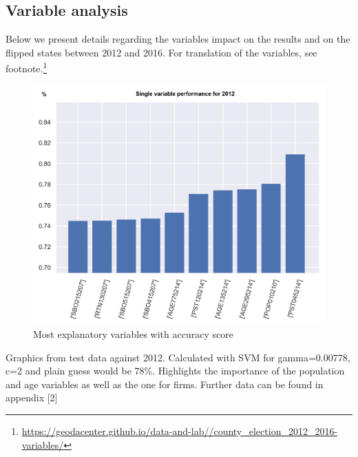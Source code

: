 \subsection{Variable analysis}
Below we present details regarding the variables impact on the results and on the flipped states between 2012 and 2016. For translation of the variables, see footnote.\footnote{\url{https://geodacenter.github.io/data-and-lab//county_election_2012_2016-variables/}}
\begin{figure}[H]
\centering
\includegraphics[scale=0.2]{pictures/results/max_12.png} 
\caption{Most explanatory variables with accuracy score}
\end{figure}
Graphics from test data against 2012. Calculated with SVM for gamma=0.00778, c=2 and plain guess would be 78\%. Highlights the importance of the population and age variables as well as the one for firms. Further data can be found in appendix [2]

